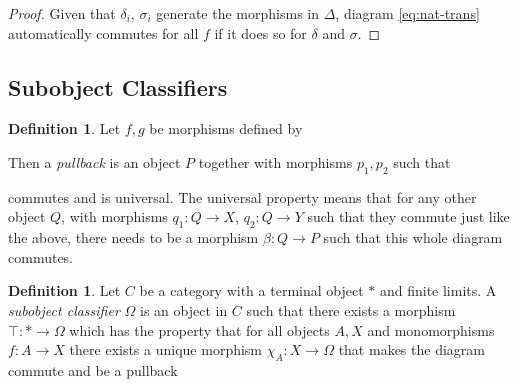 \documentclass[12pt]{article}
\theoremstyle{definition}
\newtheorem{definition}[theorem]{Definition}
\newcommand{\1}{\mathbbm{1}}
\begin{document}
\begin{proof}
    Given that $\delta_i$, $\sigma_i$ generate the morphisms in $\Delta$, diagram \ref{eq:nat-trans} automatically commutes for all $f$ if it does so for $\delta$ and $\sigma$.
\end{proof}
\subsection{Subobject Classifiers}
\begin{definition}
    Let $f, g$ be morphisms defined by
    \begin{center}
    \end{center}

    Then a \emph{pullback} is an object $P$ together with morphisms $p_1, p_2$ such that 
    \begin{center}
    \end{center}
    commutes and is universal. The universal property means that for any other object $Q$, with morphisms $q_1: Q\to X$, $q_2: Q\to Y$ such that they commute just like the above, there needs to be a morphism $\beta: Q\to P$ such that this whole diagram commutes. 

    \begin{center}
    \end{center}
\end{definition}

\begin{definition}
    Let $C$ be a category with a terminal object $*$ and finite limits. A \emph{subobject classifier} $\Omega$ is an object in $C$ such that there exists a morphism $\top: * \to \Omega$ which has the property that for all objects $A, X$ and monomorphisms $f: A\to X$ there exists a unique morphism $\chi_A: X\to \Omega$ that makes the diagram commute and be a pullback
    \begin{center}
    \end{center}
\end{definition}
\end{document}
